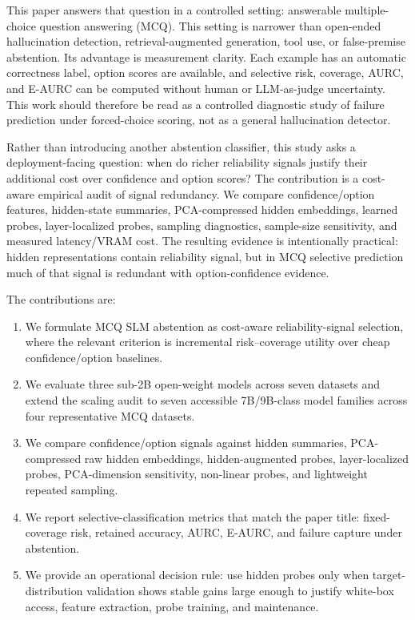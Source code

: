 \documentclass[preprint,12pt,authoryear]{elsarticle}
\begin{document}
This paper answers that question in a controlled setting: answerable multiple-choice question answering (MCQ). This setting is narrower than open-ended hallucination detection, retrieval-augmented generation, tool use, or false-premise abstention. Its advantage is measurement clarity. Each example has an automatic correctness label, option scores are available, and selective risk, coverage, AURC, and E-AURC can be computed without human or LLM-as-judge uncertainty. This work should therefore be read as a controlled diagnostic study of failure prediction under forced-choice scoring, not as a general hallucination detector.

Rather than introducing another abstention classifier, this study asks a deployment-facing question: when do richer reliability signals justify their additional cost over confidence and option scores? The contribution is a cost-aware empirical audit of signal redundancy. We compare confidence/option features, hidden-state summaries, PCA-compressed hidden embeddings, learned probes, layer-localized probes, sampling diagnostics, sample-size sensitivity, and measured latency/VRAM cost. The resulting evidence is intentionally practical: hidden representations contain reliability signal, but in MCQ selective prediction much of that signal is redundant with option-confidence evidence.

The contributions are:
\begin{enumerate}
    \item We formulate MCQ SLM abstention as cost-aware reliability-signal selection, where the relevant criterion is incremental risk--coverage utility over cheap confidence/option baselines.
    \item We evaluate three sub-2B open-weight models across seven datasets and extend the scaling audit to seven accessible 7B/9B-class model families across four representative MCQ datasets.
    \item We compare confidence/option signals against hidden summaries, PCA-compressed raw hidden embeddings, hidden-augmented probes, layer-localized probes, PCA-dimension sensitivity, non-linear probes, and lightweight repeated sampling.
    \item We report selective-classification metrics that match the paper title: fixed-coverage risk, retained accuracy, AURC, E-AURC, and failure capture under abstention.
    \item We provide an operational decision rule: use hidden probes only when target-distribution validation shows stable gains large enough to justify white-box access, feature extraction, probe training, and maintenance.
\end{enumerate}
\end{document}
